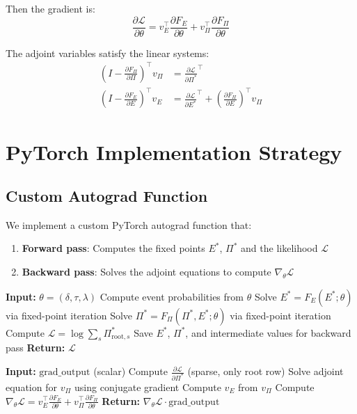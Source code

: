 \documentclass[11pt]{article}
\theoremstyle{definition}
\begin{document}
Then the gradient is:
\begin{equation}
    \frac{\partial \mathcal{L}}{\partial \theta} = v_E^\top \frac{\partial F_E}{\partial \theta} + v_\Pi^\top \frac{\partial F_\Pi}{\partial \theta}
\end{equation}

The adjoint variables satisfy the linear systems:
\begin{align}
    (I - \frac{\partial F_\Pi}{\partial \Pi})^\top v_\Pi &= \frac{\partial \mathcal{L}}{\partial \Pi^*}^\top \\
    (I - \frac{\partial F_E}{\partial E})^\top v_E &= \frac{\partial \mathcal{L}}{\partial E^*}^\top + \left(\frac{\partial F_\Pi}{\partial E}\right)^\top v_\Pi
\end{align}

\section{PyTorch Implementation Strategy}

\subsection{Custom Autograd Function}

We implement a custom PyTorch autograd function that:
\begin{enumerate}
    \item \textbf{Forward pass}: Computes the fixed points $E^*$, $\Pi^*$ and the likelihood $\mathcal{L}$
    \item \textbf{Backward pass}: Solves the adjoint equations to compute $\nabla_\theta \mathcal{L}$
\end{enumerate}

\begin{algorithm}
\caption{FixedPointLikelihood.forward}
\begin{algorithmic}[1]
\STATE \textbf{Input:} $\theta = (\delta, \tau, \lambda)$
\STATE Compute event probabilities from $\theta$
\STATE Solve $E^* = F_E(E^*; \theta)$ via fixed-point iteration
\STATE Solve $\Pi^* = F_\Pi(\Pi^*, E^*; \theta)$ via fixed-point iteration
\STATE Compute $\mathcal{L} = \log\sum_s \Pi^*_{\text{root},s}$
\STATE Save $E^*$, $\Pi^*$, and intermediate values for backward pass
\STATE \textbf{Return:} $\mathcal{L}$
\end{algorithmic}
\end{algorithm}

\begin{algorithm}
\caption{FixedPointLikelihood.backward}
\begin{algorithmic}[1]
\STATE \textbf{Input:} $\text{grad\_output}$ (scalar)
\STATE Compute $\frac{\partial \mathcal{L}}{\partial \Pi^*}$ (sparse, only root row)
\STATE Solve adjoint equation for $v_\Pi$ using conjugate gradient
\STATE Compute $v_E$ from $v_\Pi$
\STATE Compute $\nabla_\theta \mathcal{L} = v_E^\top \frac{\partial F_E}{\partial \theta} + v_\Pi^\top \frac{\partial F_\Pi}{\partial \theta}$
\STATE \textbf{Return:} $\nabla_\theta \mathcal{L} \cdot \text{grad\_output}$
\end{algorithmic}
\end{algorithm}
\end{document}
